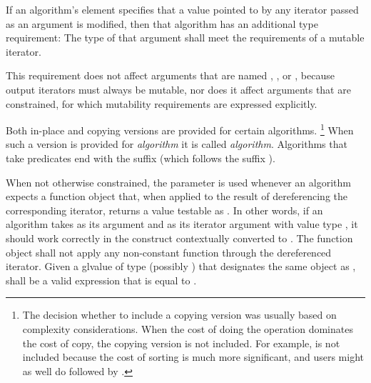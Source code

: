 \pnum
If an algorithm's \effects element specifies
that a value pointed to by any iterator passed as an argument is modified,
then that algorithm has an additional type requirement:
The type of that argument shall meet
the requirements of a mutable iterator.
\begin{note}
This requirement does not affect arguments that are named
, , or ,
because output iterators must always be mutable, nor
does it affect arguments that are constrained,
for which mutability requirements are expressed explicitly.
\end{note}

\pnum
Both in-place and copying versions are provided for certain algorithms.%
\footnote{The decision whether to include a copying version was
usually based on complexity considerations.
When the cost of doing the operation dominates the cost of copy,
the copying version is not included.
For example,  is not included
because the cost of sorting is much more significant,
and users might as well do  followed by .}
When such a version is provided for \textit{algorithm} it is called
\textit{algorithm}.
Algorithms that take predicates end with the suffix 
(which follows the suffix ).

\pnum
When not otherwise constrained, the  parameter is used
whenever an algorithm expects a function object that,
when applied to the result of dereferencing the corresponding iterator,
returns a value testable as .
In other words,
if an algorithm takes  as its argument and
 as its iterator argument with value type ,
it should work correctly in the construct
 contextually converted to .
The function object  shall not apply any non-constant function
through the dereferenced iterator.
Given a glvalue  of type (possibly ) 
that designates the same object as ,
 shall be a valid expression
that is equal to .


